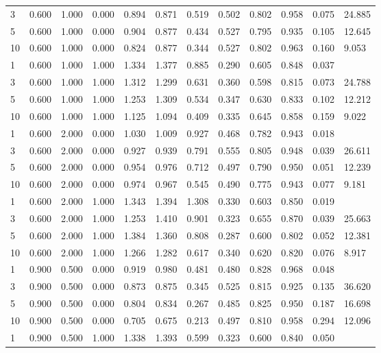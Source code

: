 {\begin{longtable}{llllllllllll}
3 & 0.600 & 1.000 & 0.000 & 0.894 & 0.871 & 0.519 & 0.502 & 0.802 & 0.958 & 0.075 & 24.885 \\
5 & 0.600 & 1.000 & 0.000 & 0.904 & 0.877 & 0.434 & 0.527 & 0.795 & 0.935 & 0.105 & 12.645 \\
10 & 0.600 & 1.000 & 0.000 & 0.824 & 0.877 & 0.344 & 0.527 & 0.802 & 0.963 & 0.160 & 9.053 \\
1 & 0.600 & 1.000 & 1.000 & 1.334 & 1.377 & 0.885 & 0.290 & 0.605 & 0.848 & 0.037 &  \\
3 & 0.600 & 1.000 & 1.000 & 1.312 & 1.299 & 0.631 & 0.360 & 0.598 & 0.815 & 0.073 & 24.788 \\
5 & 0.600 & 1.000 & 1.000 & 1.253 & 1.309 & 0.534 & 0.347 & 0.630 & 0.833 & 0.102 & 12.212 \\
10 & 0.600 & 1.000 & 1.000 & 1.125 & 1.094 & 0.409 & 0.335 & 0.645 & 0.858 & 0.159 & 9.022 \\
1 & 0.600 & 2.000 & 0.000 & 1.030 & 1.009 & 0.927 & 0.468 & 0.782 & 0.943 & 0.018 &  \\
3 & 0.600 & 2.000 & 0.000 & 0.927 & 0.939 & 0.791 & 0.555 & 0.805 & 0.948 & 0.039 & 26.611 \\
5 & 0.600 & 2.000 & 0.000 & 0.954 & 0.976 & 0.712 & 0.497 & 0.790 & 0.950 & 0.051 & 12.239 \\
10 & 0.600 & 2.000 & 0.000 & 0.974 & 0.967 & 0.545 & 0.490 & 0.775 & 0.943 & 0.077 & 9.181 \\
1 & 0.600 & 2.000 & 1.000 & 1.343 & 1.394 & 1.308 & 0.330 & 0.603 & 0.850 & 0.019 &  \\
3 & 0.600 & 2.000 & 1.000 & 1.253 & 1.410 & 0.901 & 0.323 & 0.655 & 0.870 & 0.039 & 25.663 \\
5 & 0.600 & 2.000 & 1.000 & 1.384 & 1.360 & 0.808 & 0.287 & 0.600 & 0.802 & 0.052 & 12.381 \\
10 & 0.600 & 2.000 & 1.000 & 1.266 & 1.282 & 0.617 & 0.340 & 0.620 & 0.820 & 0.076 & 8.917 \\
1 & 0.900 & 0.500 & 0.000 & 0.919 & 0.980 & 0.481 & 0.480 & 0.828 & 0.968 & 0.048 &  \\
3 & 0.900 & 0.500 & 0.000 & 0.873 & 0.875 & 0.345 & 0.525 & 0.815 & 0.925 & 0.135 & 36.620 \\
5 & 0.900 & 0.500 & 0.000 & 0.804 & 0.834 & 0.267 & 0.485 & 0.825 & 0.950 & 0.187 & 16.698 \\
10 & 0.900 & 0.500 & 0.000 & 0.705 & 0.675 & 0.213 & 0.497 & 0.810 & 0.958 & 0.294 & 12.096 \\
1 & 0.900 & 0.500 & 1.000 & 1.338 & 1.393 & 0.599 & 0.323 & 0.600 & 0.840 & 0.050 &  \\

\end{longtable}}
